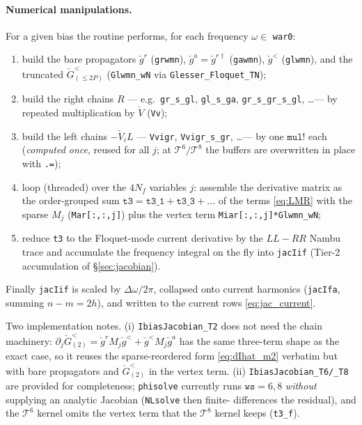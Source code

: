 \documentclass[11pt,a4paper]{article}
\begin{document}
\paragraph{Numerical manipulations.}
For a given bias the routine performs, for each frequency $\omega\in$
\texttt{war0}:
\begin{enumerate}
  \item build the bare propagators $\check g^r$ (\texttt{grwmn}),
        $\check g^a=\check g^{r\dagger}$ (\texttt{gawmn}), $\check g^<$
        (\texttt{glwmn}), and the truncated $\check G^<_{(\le2P)}$
        (\texttt{Glwmn\_wN} via \texttt{Glesser\_Floquet\_TN});
  \item build the right chains $R$ --- e.g.\ \texttt{gr\_s\_gl}, \texttt{gl\_s\_ga},
        \texttt{gr\_s\_gr\_s\_gl}, \dots --- by repeated multiplication by
        $\check V$ (\texttt{Vv});
  \item build the left chains $-\check V_i L$ --- \texttt{Vvigr},
        \texttt{Vvigr\_s\_gr}, \dots --- by one $\texttt{mul!}$ each
        (\emph{computed once}, reused for all $j$; at $\mathcal T^6/\mathcal T^8$
        the buffers are overwritten in place with \verb|.=|);
  \item loop (threaded) over the $4N_f$ variables $j$: assemble the derivative
        matrix as the order-grouped sum
        $\texttt{t3}=\texttt{t3\_1}+\texttt{t3\_3}+\dots$ of the terms
        \eqref{eq:LMR} with the sparse $M_j$ (\texttt{Mar[:,:,j]}) plus the vertex
        term \texttt{Miar[:,:,j]*Glwmn\_wN};
  \item reduce \texttt{t3} to the Floquet-mode current derivative by the
        $LL\!-\!RR$ Nambu trace and accumulate the frequency integral on the fly
        into \texttt{jacIif} (Tier-2 accumulation of \S\ref{sec:jacobian}).
\end{enumerate}
Finally \texttt{jacIif} is scaled by $\Delta\omega/2\pi$, collapsed onto current
harmonics (\texttt{jacIfa}, summing $n-m=2h$), and written to the current rows
\eqref{eq:jac_current}.

Two implementation notes.  (i) \texttt{IbiasJacobian\_T2} does not need the chain
machinery: $\partial_j\check G^<_{(2)}=\check g^r M_j\check g^<+\check g^< M_j\check
g^a$ has the same three-term shape as the exact case, so it reuses the
sparse-reordered form \eqref{eq:dIhat_m2} verbatim but with bare propagators and
$\check G^<_{(2)}$ in the vertex term.  (ii) \texttt{IbiasJacobian\_T6/\_T8} are
provided for completeness; \texttt{phisolve} currently runs $\texttt{ws}=6,8$
\emph{without} supplying an analytic Jacobian (\texttt{NLsolve} then finite-
differences the residual), and the $\mathcal T^6$ kernel omits the vertex term
that the $\mathcal T^8$ kernel keeps (\verb|t3_f|).
\end{document}
